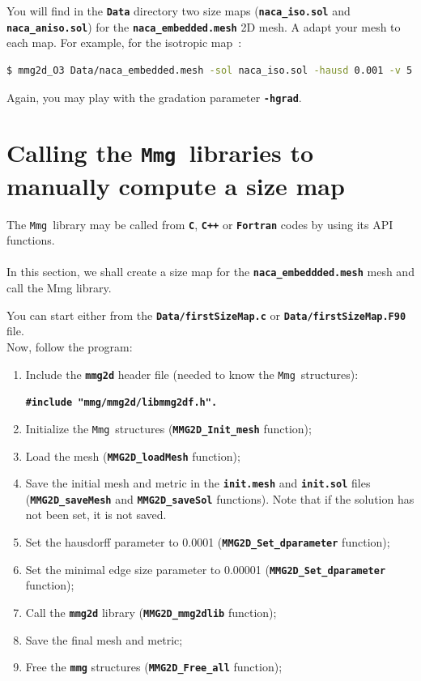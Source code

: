 \documentclass{article}
\newcommand{\ttb}[1]{\texttt{\textbf{#1}}}
\newcommand{\mmg}{\texttt{Mmg}}
\begin{document}
You will find in the \ttb{Data} directory two size maps (\ttb{naca\_iso.sol} and
\ttb{naca\_aniso.sol}) for the
\ttb{naca\_embedded.mesh} 2D mesh. A adapt your mesh to each map. For
example, for the isotropic map~:
\begin{lstlisting}[language=bash]
$ mmg2d_O3 Data/naca_embedded.mesh -sol naca_iso.sol -hausd 0.001 -v 5
\end{lstlisting}

Again, you may play with the gradation parameter \ttb{-hgrad}.

\section{Calling the \mmg\ libraries to manually compute a size map\label{size_map}}
The \mmg\ library may be called from \ttb{C}, \ttb{C++} or \ttb{Fortran} codes by
using its API functions.\\
\\
In this section, we shall create a size map for the
\ttb{naca\_embeddded.mesh} mesh and call the Mmg library.

 You can
start either from the \ttb{Data/firstSizeMap.c} or
\ttb{Data/firstSizeMap.F90} file.\\
Now, follow the program:
\begin{enumerate}
\item Include the \ttb{mmg2d} header file (needed to know the \mmg\ structures):
\begin{center}
\ttb{\#include "mmg/mmg2d/libmmg2df.h".}
\end{center}
\item Initialize the \mmg\ structures (\ttb{MMG2D\_Init\_mesh} function);
\item Load the mesh (\ttb{MMG2D\_loadMesh} function);
\item Save the initial mesh and metric in the \ttb{init.mesh} and
  \ttb{init.sol} files (\ttb{MMG2D\_saveMesh} and \ttb{MMG2D\_saveSol}
  functions). Note that if the solution has not been set, it is not saved.
\item Set the hausdorff parameter to 0.0001 (\ttb{MMG2D\_Set\_dparameter} function);
\item Set the minimal edge size parameter to 0.00001 (\ttb{MMG2D\_Set\_dparameter} function);
\item Call the \ttb{mmg2d} library (\ttb{MMG2D\_mmg2dlib} function);
\item Save the final mesh and metric;
\item Free the \ttb{mmg} structures (\ttb{MMG2D\_Free\_all} function);\\
\end{enumerate}
\end{document}
